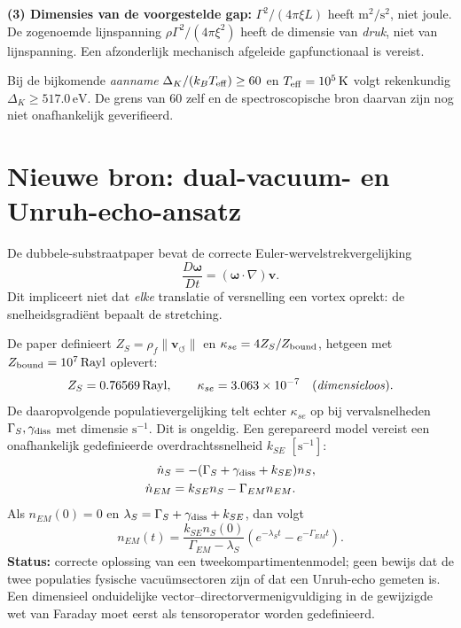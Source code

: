 \documentclass[10pt,a4paper]{article}
\newcommand{\vswirl}{\mathbf{v}_{\!\boldsymbol{\circlearrowleft}}}
\begin{document}
\textbf{(3) Dimensies van de voorgestelde gap:} \(\Gamma^2/(4\pi\xi L)\) heeft \(\mathrm{m^2/s^2}\), niet joule. De zogenoemde lijnspanning \(\rho\Gamma^2/(4\pi\xi^2)\) heeft de dimensie van \emph{druk}, niet van lijnspanning. Een afzonderlijk mechanisch afgeleide gapfunctionaal is vereist.

Bij de bijkomende \emph{aanname} \(\Delta_K/(k_BT_{\rm eff})\ge60\) en \(T_{\rm eff}=10^5\,\mathrm K\) volgt rekenkundig \(\Delta_K\ge517.0\,\mathrm{eV}\). De grens van 60 zelf en de spectroscopische bron daarvan zijn nog niet onafhankelijk geverifieerd.

\section{Nieuwe bron: dual-vacuum- en Unruh-echo-ansatz}
De dubbele-substraatpaper bevat de correcte Euler-wervelstrekvergelijking
\begin{equation}
\frac{D\boldsymbol\omega}{Dt}=(\boldsymbol\omega\cdot\nabla)\mathbf v.
\end{equation}
Dit impliceert niet dat \emph{elke} translatie of versnelling een vortex oprekt: de snelheidsgradi\"ent bepaalt de stretching.

De paper definieert \(Z_S=\rho_f\|\vswirl\|\) en \(\kappa_{se}=4Z_S/Z_{\rm bound}\), hetgeen met \(Z_{\rm bound}=10^7\,\mathrm{Rayl}\) oplevert:
\begin{equation}
Z_S=0.76569\,\mathrm{Rayl},\qquad \kappa_{se}=3.063\times10^{-7}\quad\text{(\emph{dimensieloos}).}
\end{equation}
De daaropvolgende populatievergelijking telt echter \(\kappa_{se}\) op bij vervalsnelheden \(\Gamma_S,\gamma_{\rm diss}\) met dimensie \(\mathrm{s^{-1}}\). Dit is ongeldig. Een gerepareerd model vereist een onafhankelijk gedefinieerde overdrachtssnelheid \(k_{SE}\,\,[\mathrm{s^{-1}}]\):
\begin{align}
\dot n_S&=-(\Gamma_S+\gamma_{\rm diss}+k_{SE})n_S,\\
\dot n_{EM}&=k_{SE}n_S-\Gamma_{EM}n_{EM}.
\end{align}
Als \(n_{EM}(0)=0\) en \(\lambda_S=\Gamma_S+\gamma_{\rm diss}+k_{SE}\), dan volgt
\begin{equation}
n_{EM}(t)=\frac{k_{SE}n_S(0)}{\Gamma_{EM}-\lambda_S}\left(e^{-\lambda_St}-e^{-\Gamma_{EM}t}\right).
\end{equation}
\textbf{Status:} correcte oplossing van een tweekompartimentenmodel; geen bewijs dat de twee populaties fysische vacu\"umsectoren zijn of dat een Unruh-echo gemeten is. Een dimensieel onduidelijke vector--directorvermenigvuldiging in de gewijzigde wet van Faraday moet eerst als tensoroperator worden gedefinieerd.
\end{document}
